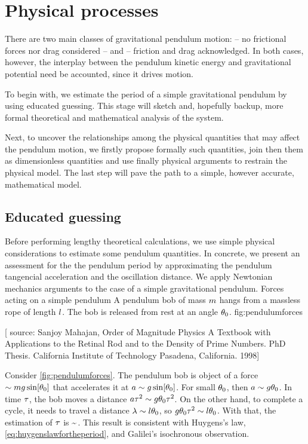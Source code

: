 \section{Physical processes}
There are two main classes of gravitational pendulum motion:  -- no frictional forces nor drag considered -- and  -- friction and drag acknowledged. In both cases, however, the interplay between the pendulum kinetic energy and gravitational potential need be accounted, since it drives motion.

To begin with, we estimate the period of a simple gravitational pendulum by using educated guessing. This stage will sketch and, hopefully backup, more formal theoretical and mathematical analysis of the system.

Next, to uncover the relationships among the physical quantities that may affect the pendulum motion, we firstly propose formally such quantities, join then them as dimensionless quantities and use finally physical arguments to restrain the physical model. The last step will pave the path to a simple, however accurate, mathematical model.


\subsection{Educated guessing}
Before performing lengthy theoretical calculations, we use simple physical considerations to estimate some pendulum quantities. In concrete, we present an assessment for the the pendulum period by approximating the pendulum tangencial acceleration and the oscillation distance. We apply Newtonian mechanics arguments to the case of a simple gravitational pendulum. 
%
   {Forces acting on a simple pendulum}
   {A pendulum bob of mass $m$ hangs from a massless rope of length $l$. The bob is released from rest at an angle $\theta_0$.}%
   {fig:pendulumforces}%

[ source: Sanjoy Mahajan, Order of Magnitude Physics A Textbook with Applications to the Retinal Rod and to the Density of Prime Numbers. PhD Thesis. California Institute of Technology Pasadena, California. 1998]

Consider \cref{fig:pendulumforces}. The pendulum bob is object of a force $\sim mg\sin\!\left[{\theta_0}\right]$ that accelerates it at $a\sim g\sin\!\left[{\theta_0}\right]$. For small $\theta_0$, then $a\sim g\theta_0$. In time $\tau$, the bob moves a distance $a\tau^2\sim g\theta_0\tau^2$. On the other hand, to complete a cycle, it needs to travel a distance $\lambda\sim l\theta_0$, so $g\theta_0\tau^2 \sim l\theta_0$. With that, the estimation of $\tau$ is
\beq
\oscper\sim\sqrt{\length/\grav}\,.
\eeq
This result is consistent with Huygens's law, \cref{eq:huygenslawfortheperiod}, and Galilei's isochronous observation.

